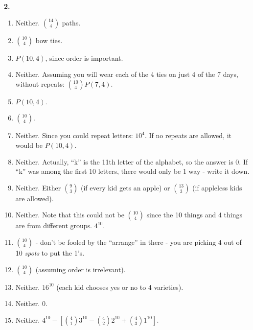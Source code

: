 \documentclass[10pt,]{book}
\theoremstyle{plain}
\theoremstyle{definition}
\theoremstyle{definition}
\theoremstyle{definition}
\numberwithin{equation}{section}
\begin{document}
\par\smallskip
\noindent\textbf{2.}\quad{}
            \leavevmode%
\begin{enumerate}[label=(\alph*)]
\item\hypertarget{li-693}{}
                  Neither. \({14 \choose 4}\) paths.
\item\hypertarget{li-694}{}\({10\choose 4}\) bow ties.%
\item\hypertarget{li-695}{}\(P(10,4)\), since order is important.%
\item\hypertarget{li-696}{}
                  Neither. Assuming you will wear each of the 4 ties on just 4 of the 7 days, without repeats: \({10\choose 4}P(7,4)\).
\item\hypertarget{li-697}{}\(P(10,4)\).%
\item\hypertarget{li-698}{}\({10\choose 4}\).%
\item\hypertarget{li-699}{}
                  Neither. Since you could repeat letters: \(10^4\). If no repeats are allowed, it would be \(P(10,4)\).
\item\hypertarget{li-700}{}
                  Neither. Actually, ``k'' is the 11th letter of the alphabet, so the answer is 0. If ``k'' was among the first 10 letters, there would only be 1 way - write it down.
\item\hypertarget{li-701}{}
                  Neither. Either \({9\choose 3}\) (if every kid gets an apple) or \({13 \choose 3}\) (if appleless kids are allowed).
\item\hypertarget{li-702}{}
                  Neither. Note that this could not be \({10 \choose 4}\) since the 10 things and 4 things are from different groups. \(4^{10}\).
\item\hypertarget{li-703}{}\({10 \choose 4}\) - don't be fooled by the ``arrange'' in there - you are picking 4 out of 10 \emph{spots} to put the 1's.%
\item\hypertarget{li-704}{}\({10 \choose 4}\) (assuming order is irrelevant).%
\item\hypertarget{li-705}{}
                  Neither. \(16^{10}\) (each kid chooses yes or no to 4 varieties).
\item\hypertarget{li-706}{}
                  Neither. 0.
\item\hypertarget{li-707}{}
                  Neither. \(4^{10} - [{4\choose 1}3^{10} - {4\choose 2}2^{10} + {4 \choose 3}1^{10}]\).

\end{enumerate}
\end{document}
